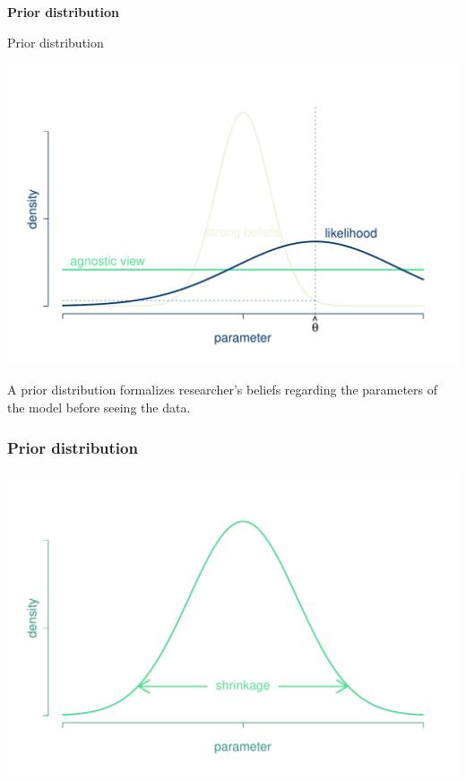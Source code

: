 \documentclass[notes,blackandwhite,mathsans]{beamer}
\begin{document}
{
\begin{frame}

\begin{adjustwidth}{-0.5cm}{0cm}
\vspace{8.3cm}\Large
\textbf{{\color{mcxs2}Prior} {\color{mcxs3}distribution}}
\end{adjustwidth}

\end{frame}
}
 

{
\begin{frame}{\color{mcxs1}Prior distribution}

\begin{center}
\includegraphics[scale=0.4]{grphs/priors.pdf}
\end{center}

{\color{mcxs1}A prior distribution formalizes researcher's beliefs regarding the parameters of the model before seeing the data.}

\end{frame}
}


{
\begin{frame}
\frametitle{Prior distribution}

\centering
\includegraphics[scale=0.45]{grphs/shrinkage.pdf}

\end{frame}
}
\end{document}
